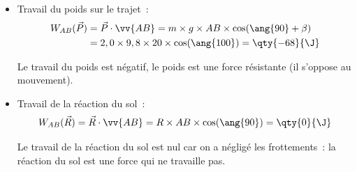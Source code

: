 \begin{enumerate}
\begin{itemize}
                  Le travail de la tension du fil est positif, la tension du fil
                  est une force motrice.
            \item Travail du poids sur le trajet~:
                  \begin{align*}
                      W_{AB}(\vec{P})&=\vec{P}\cdot\vv{AB}=
                      m\times g\times AB\times\cos(\ang{90}+\beta) \\
                      &=2,0\times9,8\times20\times\cos(\ang{100})=
                      \qty{-68}{\J}
                  \end{align*}
                  
                  Le travail du poids est négatif, le poids est une force
                  résistante (il s'oppose au mouvement).
            \item Travail de la réaction du sol~:
                  \[
                      W_{AB}(\vec{R})=\vec{R}\cdot\vv{AB}=
                      R\times AB\times\cos(\ang{90})=\qty{0}{\J}
                  \]
                  
                  Le travail de la réaction du sol est nul car on a négligé les
                  frottements~: la réaction du sol est une force qui ne
                  travaille pas.
        \end{itemize}
\end{enumerate}

